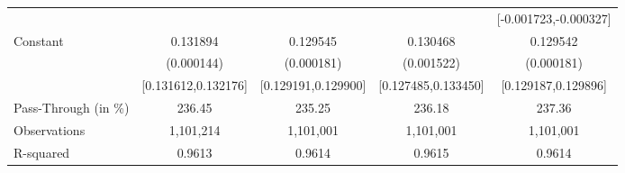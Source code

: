 {\begin{tabular}{l*{4}{c}}
                    &                     &                     &                     &[-0.001723,-0.000327]         \\
Constant            &    0.131894\sym{***}&    0.129545\sym{***}&    0.130468\sym{***}&    0.129542\sym{***}\\
                    &  (0.000144)         &  (0.000181)         &  (0.001522)         &  (0.000181)         \\
                    &[0.131612,0.132176]         &[0.129191,0.129900]         &[0.127485,0.133450]         &[0.129187,0.129896]         \\
\midrule
Pass-Through (in \%)&      236.45         &      235.25         &      236.18         &      237.36         \\
Observations        &   1,101,214         &   1,101,001         &   1,101,001         &   1,101,001         \\
R-squared           &      0.9613         &      0.9614         &      0.9615         &      0.9614         \\
\bottomrule
\end{tabular}
}
